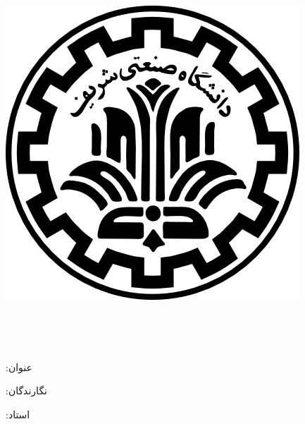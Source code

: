 
\begin{center}

\includegraphics[scale=0.2]{front/template/images/logo.png}

\vspace{-0.2cm}
\ThesisUniversity \\[-0.3em]
\ThesisDepartment

\begin{large}
\vspace{0.5cm}

\ThesisType \ \ThesisDegree \\[-0.3em]
\ThesisMajor

\end{large}

\vspace{2cm}

‫{عنوان:}\\[1.2em]
{\LARGE\textbf{\ThesisTitle}}

\vspace{2cm}

‫{نگارندگان:}\\[.5em]
{\large\textbf{\ThesisAuthor}}

\vspace{0.7cm}

‫{استاد:}\\[.5em]
{\large\textbf{\ThesisSupervisor}}

\vspace{1.3cm}

\ThesisDate

\end{center}

\newpage
